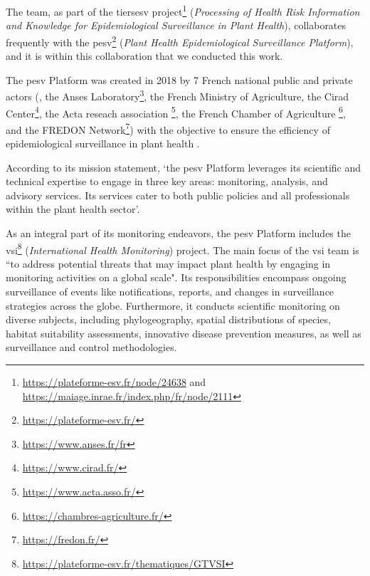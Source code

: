 \label{01_pesv_platform}



The \bibliome{} team, as part of the \gls{tiersesv} project\footnote{\url{https://plateforme-esv.fr/node/24638} and \url{https://maiage.inrae.fr/index.php/fr/node/2111}} (\emph{Processing of Health Risk Information and Knowledge for Epidemiological Surveillance in Plant Health}), collaborates frequently with the 
 \gls{pesv}\footnote{\url{https://plateforme-esv.fr/}} (\emph{Plant Health Epidemiological Surveillance Platform}),  and it is within this collaboration that we conducted this work.


The \gls{pesv} Platform was created in 2018 by 
7 French national public and private actors (\INRAE{},
the Anses Laboratory\footnote{\url{https://www.anses.fr/fr}}, 
the French Ministry of Agriculture, the Cirad Center\footnote{\url{https://www.cirad.fr/}}, the Acta reseach association \footnote{\url{https://www.acta.asso.fr/}},
the French Chamber of Agriculture \footnote{\url{https://chambres-agriculture.fr/}}, 
and the FREDON Network\footnote{\url{https://fredon.fr/}})  with  the objective to ensure the efficiency of epidemiological surveillance in plant health  .


According to its mission statement, `the \gls{pesv} Platform leverages its scientific and technical expertise to engage in three key areas: monitoring, analysis, and advisory services. Its services cater to both public policies and all professionals within the plant health sector'.

As an integral part of its monitoring endeavors, the \gls{pesv} Platform includes the \gls{vsi}\footnote{\url{https://plateforme-esv.fr/thematiques/GTVSI}} (\emph{International Health Monitoring})  project. The main focus of the \gls{vsi} team is ``to address potential threats that may impact plant health by engaging in monitoring activities on a global scale". Its responsibilities encompass ongoing surveillance of events like notifications, reports, and changes in surveillance strategies across the globe. Furthermore, it conducts scientific monitoring on diverse subjects, including phylogeography, spatial distributions of species, habitat suitability assessments, innovative disease prevention measures, as well as surveillance and control methodologies.



